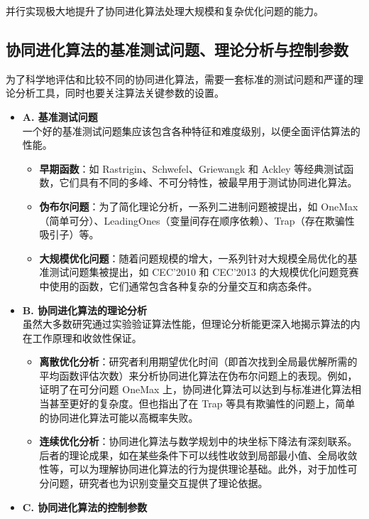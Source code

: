 并行实现极大地提升了协同进化算法处理大规模和复杂优化问题的能力。

\subsection{协同进化算法的基准测试问题、理论分析与控制参数}

为了科学地评估和比较不同的协同进化算法，需要一套标准的测试问题和严谨的理论分析工具，同时也要关注算法关键参数的设置。

\begin{itemize}
    \item \textbf{A. 基准测试问题} \\
    一个好的基准测试问题集应该包含各种特征和难度级别，以便全面评估算法的性能。
    \begin{itemize}
        \item \textbf{早期函数}：如 Rastrigin、Schwefel、Griewangk 和 Ackley 等经典测试函数，它们具有不同的多峰、不可分特性，被最早用于测试协同进化算法。
        \item \textbf{伪布尔问题}：为了简化理论分析，一系列二进制问题被提出，如 OneMax（简单可分）、LeadingOnes（变量间存在顺序依赖）、Trap（存在欺骗性吸引子）等。
        \item \textbf{大规模优化问题}：随着问题规模的增大，一系列针对大规模全局优化的基准测试问题集被提出，如 CEC'2010 和 CEC'2013 的大规模优化问题竞赛中使用的函数，它们通常包含各种复杂的分量交互和病态条件。
    \end{itemize}
    \item \textbf{B. 协同进化算法的理论分析} \\
    虽然大多数研究通过实验验证算法性能，但理论分析能更深入地揭示算法的内在工作原理和收敛性保证。
    \begin{itemize}
        \item \textbf{离散优化分析}：研究者利用期望优化时间（即首次找到全局最优解所需的平均函数评估次数）来分析协同进化算法在伪布尔问题上的表现。例如，证明了在可分问题 OneMax 上，协同进化算法可以达到与标准进化算法相当甚至更好的复杂度。但也指出了在 Trap 等具有欺骗性的问题上，简单的协同进化算法可能以高概率失败。
        \item \textbf{连续优化分析}：协同进化算法与数学规划中的块坐标下降法有深刻联系。后者的理论成果，如在某些条件下可以线性收敛到局部最小值、全局收敛性等，可以为理解协同进化算法的行为提供理论基础。此外，对于加性可分问题，研究者也为识别变量交互提供了理论依据。
    \end{itemize}
    \item \textbf{C. 协同进化算法的控制参数} \\

\end{itemize}
